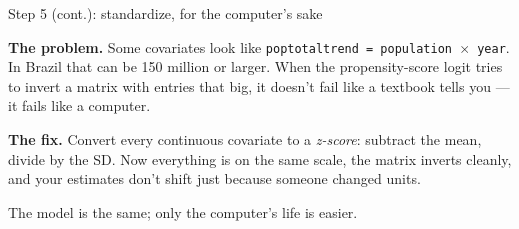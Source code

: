 \documentclass[aspectratio=169,12pt,t]{beamer}
\begin{document}
\begin{frame}{Step 5 (cont.): standardize, for the computer's sake}
\vspace{0.5cm}

\textbf{The problem.} \;Some covariates look like \texttt{poptotaltrend = population $\times$ year}. \;In Brazil that can be 150 million or larger. \;When the propensity-score logit tries to invert a matrix with entries that big, it doesn't fail like a textbook tells you --- it fails like a computer.

\vspace{0.5cm}

\textbf{The fix.} \;Convert every continuous covariate to a \textit{z-score}: subtract the mean, divide by the SD. \;Now everything is on the same scale, the matrix inverts cleanly, and your estimates don't shift just because someone changed units.

\vspace{0.5cm}

 \;The model is the same; only the computer's life is easier.
\end{frame}
\end{document}
